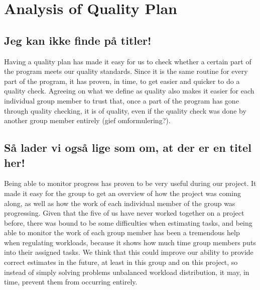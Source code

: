 \section{Analysis of Quality Plan}
\subsection{Jeg kan ikke finde på titler!}
Having a quality plan has made it easy for us to check whether a certain part of the program meets our quality standards. Since it is the same routine for every part of the program, it has proven, in time, to get easier and quicker to do a quality check. Agreeing on what we define as quality also makes it easier for each individual group member to trust that, once a part of the program has gone through quality checking, it is of quality, even if the quality check was done by another group member entirely (gief omformulering?).

\subsection{Så lader vi også lige som om, at der er en titel her!}
Being able to monitor progress has proven to be very useful during our project. It made it easy for the group to get an overview of how the project was coming along, as well as how the work of each individual member of the group was progressing. Given that the five of us have never worked together on a project before, there was bound to be some difficulties when estimating tasks, and being able to monitor the work of each group member has been a tremendous help when regulating workloads, because it shows how much time group members puts into their assigned tasks.
We think that this could improve our ability to provide correct estimates in the future, at least in this group and on this project, so instead of simply solving problems unbalanced workload distribution, it may, in time, prevent them from occurring entirely.